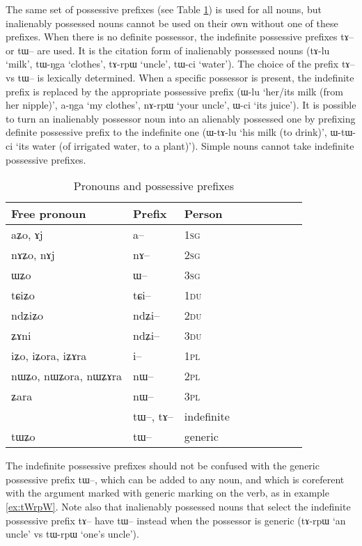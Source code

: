 \documentclass[oldfontcommands,oneside,a4paper,11pt]{article}
\newcommand{\ipa}[1]{{\phon #1}} %
\begin{document}
The same set of possessive prefixes (see Table \ref{tab:pronoun}) is used for all nouns, but inalienably possessed nouns cannot be used on their own without one of these prefixes. When there is no definite possessor, the indefinite possessive prefixes \ipa{tɤ--} or \ipa{tɯ--} are used. It is the citation form of inalienably possessed nouns (\ipa{tɤ-lu} `milk', \ipa{tɯ-ŋga} `clothes', \ipa{tɤ-rpɯ} `uncle', \ipa{tɯ-ci} `water'). The choice of the prefix \ipa{tɤ--} vs \ipa{tɯ--} is lexically determined.  When a specific possessor is present, the indefinite prefix is replaced by the appropriate possessive prefix (\ipa{ɯ-lu} `her/its milk (from her nipple)', \ipa{a-ŋga} `my clothes', \ipa{nɤ-rpɯ} `your uncle', \ipa{ɯ-ci} `its juice'). It is possible to turn an inalienably possessor noun into an alienably possessed one by prefixing definite possessive prefix to the indefinite one (\ipa{ɯ-tɤ-lu} `his milk (to drink)', \ipa{ɯ-tɯ-ci} `its water (of irrigated water, to a plant)'). Simple nouns cannot take indefinite possessive prefixes.


\begin{table}[H] \centering
\caption{Pronouns and possessive prefixes }\label{tab:pronoun}
\begin{tabular}{lllllllll} 
\toprule
 Free pronoun & Prefix & Person\\
\midrule
 \ipa{aʑo},    \ipa{ɤj} &	\ipa{a--}  &		1\textsc{sg} \\
\ipa{nɤʑo},  \ipa{nɤj} &	\ipa{nɤ--}  &			2\textsc{sg}\\
\ipa{ɯʑo}  &	\ipa{ɯ--}  &			3\textsc{sg}\\
\midrule
\ipa{tɕiʑo}  &	\ipa{tɕi--}  &			1\textsc{du} \\
\ipa{ndʑiʑo}  &	\ipa{ndʑi--}  &		2\textsc{du} \\	
\ipa{ʑɤni}  &	\ipa{ndʑi--}  &		3\textsc{du} \\	
\midrule
\ipa{iʑo}, \ipa{iʑora},   \ipa{iʑɤra}   &	\ipa{i--}  &			1\textsc{pl} \\
\ipa{nɯʑo}, \ipa{nɯʑora},   \ipa{nɯʑɤra}  &	\ipa{nɯ--}  &			2\textsc{pl} \\
\ipa{ʑara}  &	\ipa{nɯ--}  &			3\textsc{pl} \\
\midrule
&  \ipa{tɯ--},  \ipa{tɤ--} & indefinite \\
\ipa{tɯʑo} & \ipa{tɯ--}   &  generic\\
\bottomrule
\end{tabular}
\end{table}

The indefinite possessive prefixes should not be confused with the generic possessive prefix \ipa{tɯ--}, which can be added to any noun, and which is coreferent with the argument marked with generic marking on the verb, as in example \ref{ex:tWrpW}. Note also that inalienably possessed nouns that select the indefinite possessive prefix \ipa{tɤ--} have \ipa{tɯ--} instead when the possessor is generic (\ipa{tɤ-rpɯ} `an uncle' vs \ipa{tɯ-rpɯ} `one's uncle').
\end{document}
